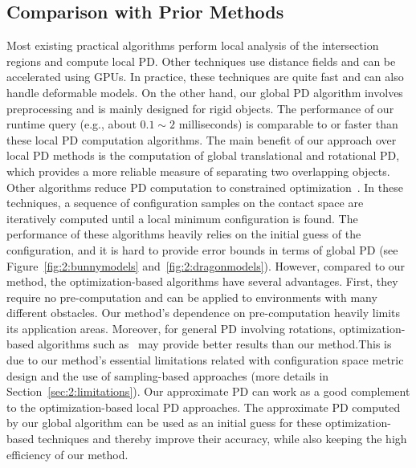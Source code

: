 \subsection{Comparison with Prior Methods}
Most existing practical algorithms perform local analysis of the intersection regions and
compute local PD. Other techniques use distance fields and can be accelerated using GPUs. In practice, these techniques are quite fast and can also handle
deformable models. On the other hand, our global PD algorithm involves preprocessing and is mainly designed for rigid objects.
The performance of our runtime query (e.g., about $0.1\sim2$ milliseconds) is comparable to or faster than these local PD computation algorithms. The main benefit of our approach over local PD methods is the computation of global
translational and rotational PD, which provides a more reliable measure of separating two overlapping objects.
Other algorithms reduce PD computation to constrained optimization~\cite{Nawratil:2009:GPD,Zhang:2007:AFP,Je:2012:PRP,Tang:IGP:2013}.
In these techniques, a sequence of configuration samples on the contact space are iteratively
computed until a local minimum configuration is found. The
performance of these algorithms heavily relies on the initial guess of the configuration, and it is hard to provide
error bounds in terms of global PD (see Figure~\ref{fig:2:bunnymodels} and~\ref{fig:2:dragonmodels}). 
However, compared to our method, the optimization-based algorithms have several advantages. First, they require no pre-computation and can be applied to environments with many different obstacles. Our method's dependence on pre-computation heavily limits its application areas.
Moreover, for general PD involving rotations, optimization-based algorithms such as~\cite{Tang:IGP:2013} may provide better results than our method.This is due to our method's essential limitations related with configuration space metric design and the use of sampling-based approaches (more details in Section~\ref{sec:2:limitations}).
Our approximate PD can work as a good complement to the optimization-based local PD approaches. The approximate PD computed by our global algorithm can be used as an initial guess for these optimization-based techniques and thereby improve their accuracy, while also keeping the high efficiency of our method.


